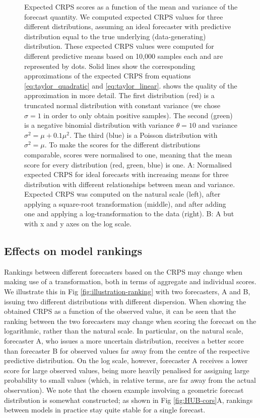\documentclass[10pt,letterpaper]{article}
\begin{document}
\begin{figure}[h!]
    \centering
    \caption{Expected CRPS scores as a function of the mean and variance of the forecast quantity. We computed expected CRPS values  for three different distributions, assuming an ideal forecaster with predictive distribution equal to the true underlying (data-generating) distribution. 
    These expected CRPS values were computed for different predictive means based on 10,000 samples each and are represented by dots. Solid lines show the corresponding approximations of the expected CRPS from equations \eqref{eq:taylor_quadratic} and \eqref{eq:taylor_linear}.  shows the quality of the approximation in more detail. 
    The first distribution (red) is a truncated normal distribution with constant variance (we chose $\sigma = 1$ in order to only obtain positive samples). The second (green) is a negative binomial distribution with variance $\theta = 10$ and variance $\sigma^2 = \mu + 0.1\mu^2$. The third (blue) is a
    Poisson distribution with $\sigma^2 = \mu$. To make the scores for the different distributions comparable, scores were normalised to one, meaning that the mean score for every distribution (red, green, blue) is one. 
    A: Normalised expected CRPS for ideal forecasts with increasing means for three distribution with different relationships between mean and variance. Expected CRPS was computed on the natural scale (left), after applying a square-root transformation (middle), and after adding one and applying a log-transformation to the data (right). B: A but with x and y axes on the log scale.}
    \label{fig:SIM-wis-state-size-mean}
\end{figure}


\subsection*{Effects on model rankings}
\label{sec:methods:rankings}
Rankings between different forecasters based on the CRPS may change when making use of a transformation, both in terms of aggregate and individual scores. We illustrate this in Fig \ref{fig:illustration-ranking} with two forecasters, A and B, issuing two different distributions with different dispersion. When showing the obtained CRPS as a function of the observed value, it can be seen that the ranking between the two forecasters may change when scoring the forecast on the logarithmic, rather than the natural scale. In particular, on the natural scale, forecaster A, who issues a more uncertain distribution, receives a better score than forecaster B for observed values far away from the centre of the respective predictive distribution. On the log scale, however, forecaster A receives a lower score for large observed values, being more heavily penalised for assigning large probability to small values (which, in relative terms, are far away from the actual observation). We note that the chosen example involving a geometric forecast distribution is somewhat constructed; as shown in Fig \ref{fig:HUB-cors}A, rankings between models in practice stay quite stable for a single forecast. 
\end{document}
